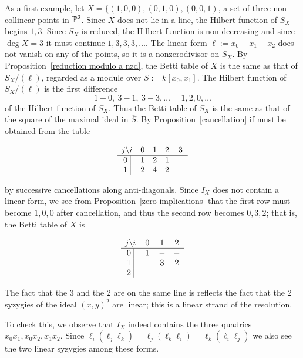 \begin{example}\label{3 points in P2}
As a first example, let $X = \{(1,0,0), (0,1,0), (0,0,1)$, a set of three non-collinear points in ${\mathbb P}^2$. Since $X$ does not lie in a line, the Hilbert function of $S_{X}$ begins $1,3$. Since $S_{X}$ is reduced, the Hilbert function is non-decreasing and since $\deg X = 3$ it must continue $1,3,3,3,\dots$. The linear form 
$\ell :=x_{0}+x_{1}+x_{2}$ does not vanish on any of the points, so it is a nonzerodivisor on $S_{X}$. By Proposition~\ref{reduction modulo a nzd}, the Betti table of $X$ is the same as that of 
$S_{X}/(\ell)$, regarded as a module over $\overline S := k[x_{0}, x_{1}]$. The Hilbert function of $S_{X}/(\ell)$ is the first difference 
$$
1-0,\ 3-1,\ 3-3,\dots = 1,2,0,\dots
$$
of the Hilbert function of $S_{X}$. Thus the Betti table of $S_{X}$ is the same as that of the square of the maximal ideal in $\overline S$. By Proposition~\ref{cancellation} if must be obtained from the table
\begin{small}
$$
\begin{matrix}
j \backslash i &0&1&2&3\\ \hline
\text{0 }\vline &1&2&1\\
\text{1 }\vline &2&4&2&-\\
\end{matrix}
$$
\end{small}
by successive cancellations along anti-diagonals. Since $I_{X}$ does not contain a linear form, we see from Proposition~\ref{zero implications} that the first row
must become $1,0,0$ after cancellation, and thus the second row becomes
$0,3,2$; that is, the Betti table of $X$ is
\begin{small}
$$
\begin{matrix}
j \backslash i     &0&1&2\\ \hline
\text{0 }\vline &1&-&-\\
\text{1 }\vline &-&3&2\\
\text{2 }\vline &-&-&-\\
\end{matrix}
$$
\end{small}
The fact that the 3 and the 2 are on the same line is reflects the fact that the 2 syzygies of the ideal $(x,y)^{2}$ are linear; this is a linear strand of the resolution. 

To check this, we observe that $I_{X}$ indeed contains the three quadrics $x_{0}x_{1}, x_{0}x_{2}, x_{1}x_{2}$.
Since $ \ell_i(\ell_j\ell_k) = \ell_j(\ell_k\ell_i) = \ell_k(\ell_i\ell_j)$ we also see the
 two linear syzygies among these forms. 
 

\end{example}
